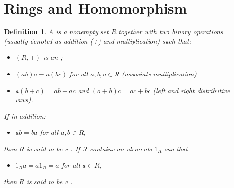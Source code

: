 \documentclass[a4paper]{article}
\newtheorem{definition}{Definition}[section]
\begin{document}


\section{Rings and Homomorphism}

\begin{definition}
  A  is a nonempty set $R$
  together with two binary operations (usually denoted as addition (+) and multiplication) such that:
  \begin{itemize}
    \item $(R, +)$ is an  ;
    \item $(ab)c = a(bc)$ for all $a, b, c \in R$ (associate multiplication)
    \item $a(b + c) = ab + ac$ and $(a+b)c = ac + bc$
      (left and right distributive laws).
  \end{itemize}

  If in addition:
  \begin{itemize}
    \item $ab = ba$ for all $a, b \in R$,
  \end{itemize}

  then $R$ is said to be a .
  If $R$ contains an elements $1_R$ suc that
  \begin{itemize}
    \item $1_R a = a 1_R = a$ for all $a \in R$,
  \end{itemize}

  then $R$ is said to be a .
\end{definition}



\end{document}
